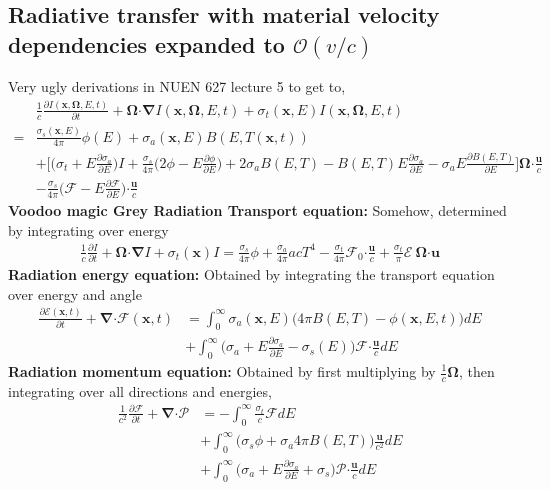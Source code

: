 \documentclass[10pt,letterpaper,notitlepage]{article}
\numberwithin{equation}{section}
\newcommand{\partialderiv}[2]{\frac{\partial #1}{\partial #2}}
\newcommand{\Omegabf}{\mathbf{\Omega}}
\newcommand{\bnabla}{\boldsymbol{\nabla}}
\newcommand{\position}{\mathbf{x}}
\newcommand{\velocity}{\mathbf{u}}
\newcommand{\dotp}{\boldsymbol{\cdot}}
\newcommand{\RadE}{\mathcal{E}}
\newcommand{\RadF}{\boldsymbol{\mathcal{F}}}
\newcommand{\RadP}{\boldsymbol{\mathcal{P}}}
\newcommand{\beqn}{\begin{equation}\begin{aligned}}
\newcommand{\eeqn}{\end{aligned}\end{equation}}
\begin{document}
\subsection{Radiative transfer with material velocity dependencies expanded to $\mathcal{O}(v/c)$}
Very ugly derivations in NUEN 627 lecture 5 to get to,
\beqn 
&\frac{1}{c} \frac{\partial I(\position, \Omegabf, E, t)}{\partial t} 
+\Omegabf \dotp \bnabla I(\position, \Omegabf, E, t)
+\sigma_t(\position,E) I(\position, \Omegabf, E, t) \\
=& \frac{\sigma_s(\position,E)}{4\pi} \phi(E)
+ \sigma_a(\position,E) B(E,T(\position, t))\\
&+
\biggr[
\biggr( \sigma_t + E \frac{\partial \sigma_a}{\partial E} \biggr) I
+\frac{\sigma_s}{4\pi}
\biggr(
2\phi - E \frac{\partial \phi}{\partial E}
\biggr)
+2\sigma_a B(E,T)
- B(E,T) E \frac{\partial \sigma_a}{\partial E}
-\sigma_a E \frac{\partial B(E,T)}{\partial E}
\biggr] \Omegabf \dotp \frac{\mathbf{u}}{c} \\
&-\frac{\sigma_s}{4\pi} \biggr( \RadF - E \frac{\partial \RadF}{\partial E} \biggr) \dotp \frac{\mathbf{u}}{c}
\eeqn 
\newline
\newline
\textbf{Voodoo magic Grey Radiation Transport equation:}\newline
Somehow, determined by integrating over energy
\beqn 
\frac{1}{c} \frac{\partial I}{\partial t} 
+\Omegabf \dotp \bnabla I
+\sigma_t(\position) I 
=\frac{\sigma_s}{4\pi} \phi
+ \frac{\sigma_a}{4\pi} a c T^4
-\frac{\sigma_t}{4\pi}  \RadF_0 \dotp \frac{\mathbf{u}}{c} 
+ \frac{\sigma_t}{\pi} \RadE \ \Omegabf \dotp \velocity
\eeqn 
\newline
\newline
\textbf{Radiation energy equation:}\newline 
Obtained by integrating the transport equation over energy and angle
\beqn 
 \frac{\partial \RadE(\position, t)}{\partial t} 
+\bnabla \dotp \RadF(\position, t) &= \int_0^\infty \sigma_a(\position, E) \bigr( 4\pi B(E,T) - \phi(\position, E, t) \bigr) dE \\
&+\int_0^\infty \biggr( \sigma_a + E \frac{\partial \sigma_a}{\partial E} - \sigma_s(E)\biggr)
\RadF \dotp  \frac{\mathbf{u}}{c}
dE
\eeqn 
\newline
\newline 
\textbf{Radiation momentum equation:}\newline
Obtained by first multiplying by $\frac{1}{c} \Omegabf$, then integrating over all directions and energies,
\beqn 
\frac{1}{c^2} \partialderiv{\RadF}{t} + \bnabla \dotp \RadP &= -\int_0^\infty \frac{\sigma_t}{c} \RadF dE \\
&+\int_0^\infty \bigr( \sigma_s \phi + \sigma_a 4\pi B(E,T) \bigr) \frac{\mathbf{u}}{c^2}dE \\
&+\int_0^\infty \biggr( \sigma_a + E \partialderiv{\sigma_a}{E} + \sigma_s\biggr) \RadP \dotp \frac{\mathbf{u}}{c} dE
\eeqn 
\end{document}
